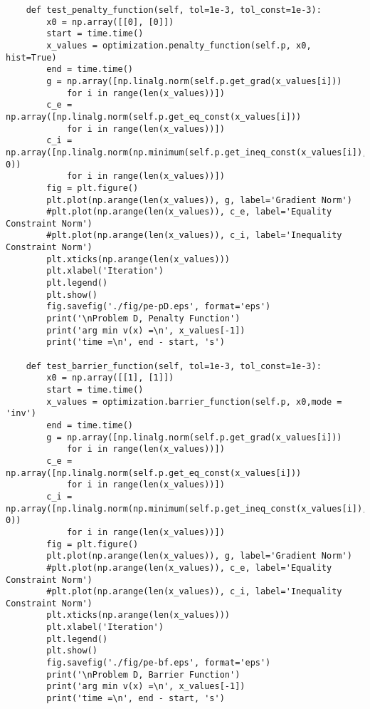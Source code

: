 \begin{lstlisting}
    def test_penalty_function(self, tol=1e-3, tol_const=1e-3):
        x0 = np.array([[0], [0]])
        start = time.time()
        x_values = optimization.penalty_function(self.p, x0, hist=True)
        end = time.time()
        g = np.array([np.linalg.norm(self.p.get_grad(x_values[i]))
            for i in range(len(x_values))])
        c_e = np.array([np.linalg.norm(self.p.get_eq_const(x_values[i]))
            for i in range(len(x_values))])
        c_i = np.array([np.linalg.norm(np.minimum(self.p.get_ineq_const(x_values[i]), 0))
            for i in range(len(x_values))])
        fig = plt.figure()
        plt.plot(np.arange(len(x_values)), g, label='Gradient Norm')
        #plt.plot(np.arange(len(x_values)), c_e, label='Equality Constraint Norm')
        #plt.plot(np.arange(len(x_values)), c_i, label='Inequality Constraint Norm')
        plt.xticks(np.arange(len(x_values)))
        plt.xlabel('Iteration')
        plt.legend()
        plt.show()
        fig.savefig('./fig/pe-pD.eps', format='eps')
        print('\nProblem D, Penalty Function')
        print('arg min v(x) =\n', x_values[-1])
        print('time =\n', end - start, 's')

    def test_barrier_function(self, tol=1e-3, tol_const=1e-3):
        x0 = np.array([[1], [1]])
        start = time.time()
        x_values = optimization.barrier_function(self.p, x0,mode = 'inv')
        end = time.time()
        g = np.array([np.linalg.norm(self.p.get_grad(x_values[i]))
            for i in range(len(x_values))])
        c_e = np.array([np.linalg.norm(self.p.get_eq_const(x_values[i]))
            for i in range(len(x_values))])
        c_i = np.array([np.linalg.norm(np.minimum(self.p.get_ineq_const(x_values[i]), 0))
            for i in range(len(x_values))])
        fig = plt.figure()
        plt.plot(np.arange(len(x_values)), g, label='Gradient Norm')
        #plt.plot(np.arange(len(x_values)), c_e, label='Equality Constraint Norm')
        #plt.plot(np.arange(len(x_values)), c_i, label='Inequality Constraint Norm')
        plt.xticks(np.arange(len(x_values)))
        plt.xlabel('Iteration')
        plt.legend()
        plt.show()
        fig.savefig('./fig/pe-bf.eps', format='eps')
        print('\nProblem D, Barrier Function')
        print('arg min v(x) =\n', x_values[-1])
        print('time =\n', end - start, 's')
    

\end{lstlisting}
